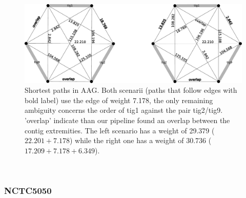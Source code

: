 \documentclass[./main.tex]{subfiles}
\begin{document}
\begin{figure}[!hb]

    \centerline{\includegraphics[width=\textwidth]{supplemental/knot/NCTC12123_possible_solution-crop.pdf}}
%       
%
%
%
    \caption{
        Shortest paths in AAG. Both scenarii (paths that follow edges with bold label) use the edge of weight 7.178, the only remaining ambiguity concerns the order of tig1 against the pair tig2/tig9. 'overlap' indicate than our pipeline found an overlap between the contig extremities. The left scenario has a weight of 29.379 ($22.201 + 7.178$) while the right one has a weight of 30.736 ($17.209 + 7.178 + 6.349$).\ 
     }
     \label{fg:appendix:NCTC12123_solutions}
\end{figure}

~

\subsubsection*{NCTC5050}
\end{document}
